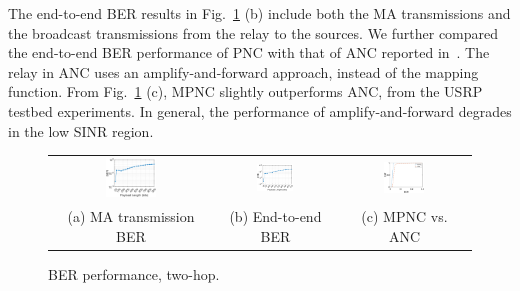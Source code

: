 %                         


The end-to-end BER results in Fig.~\ref{fig:e2e_ber} (b) include both the MA transmissions and the broadcast transmissions from the relay to the sources. We further compared the end-to-end BER performance of PNC with that of ANC reported in~\cite{katti2007embracing}. The relay in ANC uses an amplify-and-forward approach, instead of the mapping function. From Fig.~\ref{fig:e2e_ber} (c),  MPNC slightly outperforms ANC, from the USRP testbed experiments. In general, the performance of amplify-and-forward degrades in the low SINR region. 

\begin{figure}
\centering
\begin{tabular}{ccc}
    \includegraphics[width=0.33\textwidth]{figures/BER_Payload_MA.eps} &
    \includegraphics[width=0.33\textwidth]{figures/BER_Payload_e2e.eps}&
     \includegraphics[width=0.33\textwidth]{figures/cdf}\\
      (a) MA  transmission BER &    (b) End-to-end BER & (c) MPNC vs. ANC
      \end{tabular}
       \caption{BER performance, two-hop.}
    \label{fig:e2e_ber}
\end{figure}

